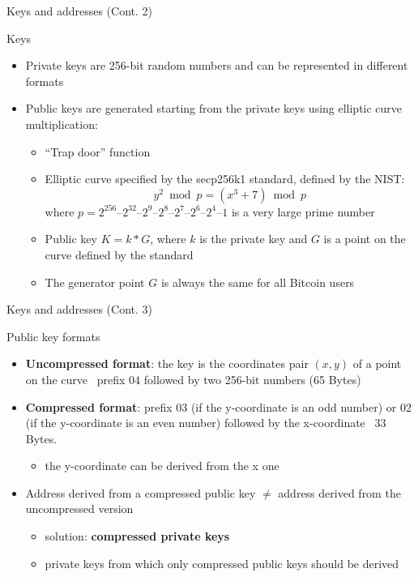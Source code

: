 \documentclass{beamer}
\begin{document}
  \begin{frame}{Keys and addresses (Cont. 2)}
    \begin{block}{Keys}
      \begin{itemize}
        \item Private keys are 256-bit random numbers and can be represented
        in different formats \pause
        \item Public keys are generated starting from the private keys using
        elliptic curve multiplication: \pause
        \begin{itemize}
          \item ``Trap door'' function 
          \item Elliptic curve  specified by the secp256k1 standard, defined by the NIST:
          \[ y^2 \bmod p = (x^3 + 7) \bmod p \]
          where $p = 2^{256} – 2^{32} – 2^9 – 2^8 – 2^7 – 2^6 – 2^4 – 1$ is a very large prime number 
          \item Public key $K=k*G$, where $k$ is the private key and $G$ is
          a point on the curve defined by the standard 
          \item The generator point $G$ is always the same for all Bitcoin users
        \end{itemize}
      \end{itemize}
    \end{block}
  \end{frame}





  \begin{frame}{Keys and addresses (Cont. 3)}
    \begin{block}{Public key formats}
      \begin{itemize}
        \item \textbf{Uncompressed format}: the key is the coordinates pair
        $(x,y)$ of a point on the curve \MVRightarrow\, prefix $04$ followed by
        two 256-bit numbers (65 Bytes) \pause
        \item \textbf{Compressed format}: prefix $03$ (if the y-coordinate is an
        odd number) or $02$ (if the y-coordinate is an even number) followed
        by the x-coordinate \MVRightarrow\ 33 Bytes.
        \begin{itemize}
          \item the y-coordinate can be derived from the x one \pause
        \end{itemize}
        \item Address derived from a compressed public key $\neq$ address derived
        from the uncompressed version \pause
        \begin{itemize}
          \item solution: \textbf{compressed private keys}
          \item private keys from which only compressed
          public keys should be derived
        \end{itemize}
      \end{itemize}
    \end{block}
  \end{frame}
\end{document}
